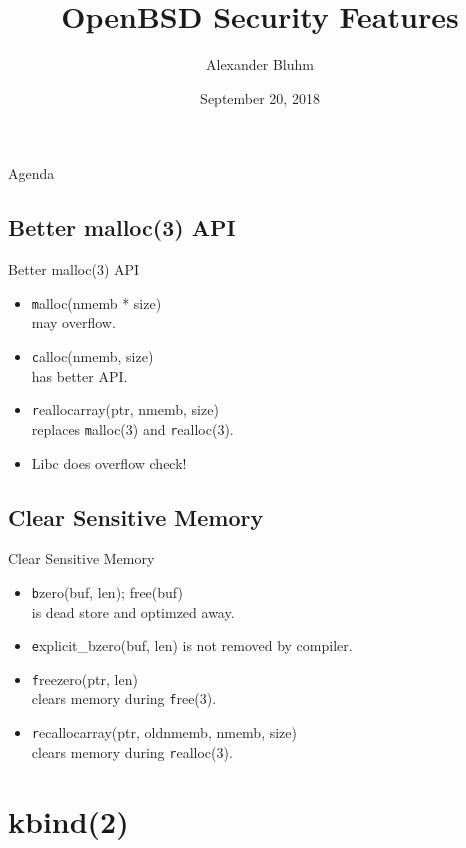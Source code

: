 \documentclass[14pt]{beamer}
\author{Alexander Bluhm}
\title{OpenBSD Security Features}
\institute{genua GmbH\\ \url{bluhm@genua.de}\\ \url{bluhm@openbsd.org}}
\date{September 20, 2018}
\begin{document}
\begin{frame}
\titlepage
\end{frame}

\begin{frame}{Agenda}
\setcounter{tocdepth}{1}
\tableofcontents
\end{frame}

\subsection{Better malloc(3) API}
\begin{frame}{Better malloc(3) API}
\begin{itemize}
    \item {\texttt malloc(nmemb * size)}\\
	may overflow.
    \item {\texttt calloc(nmemb, size)}\\
	has better API.
    \item {\texttt reallocarray(ptr, nmemb, size)}\\
	replaces {\texttt malloc(3)} and {\texttt realloc(3)}.
    \item Libc does overflow check!
\end{itemize}
\end{frame}

\subsection{Clear Sensitive Memory}
\begin{frame}{Clear Sensitive Memory}
\begin{itemize}
    \item {\texttt bzero(buf, len); free(buf)}\\
	is dead store and optimzed away.
    \item {\texttt explicit\_bzero(buf, len)}
	is not removed by compiler.
    \item {\texttt freezero(ptr, len)}\\
	clears memory during {\texttt free(3)}.
    \item {\texttt recallocarray(ptr, oldnmemb, nmemb, size)}\\
	clears memory during {\texttt realloc(3)}.
\end{itemize}
\end{frame}


\section{kbind(2)}
\end{document}
